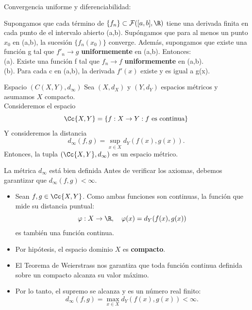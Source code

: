 \begin{frame}{Convergencia uniforme y diferenciabilidad: }
    \begin{teorema}
        Supongamos que cada término de $\{f_{n}\}\subset \mathcal{F}([a,b], \R)$ tiene una derivada finita en cada punto de el intervalo
        abierto (a,b). Supóngamos que para al menos un punto $x_0$ en (a,b), la sucesión $\{f_{n}(x_0)\}$ converge. Además, 
        supongamos que existe una función g tal que $f'_{n}\to g$ \textbf{uniformemente} en (a,b). Entonces:\\
        \medskip
        (a). Existe una función f tal que $f_{n}\to f$ \textbf{uniformemente} en (a,b).\\
        (b). Para cada c en (a,b), la derivada $f'(x)$ existe y es igual a g(x).
    \end{teorema}
\end{frame}


\begin{frame}{Espacio $(C(X,Y),d_{\infty})$}
    Sea $(X, d_X)$ y $(Y, d_Y)$ espacios métricos y asumamos $X$ compacto.\\
    Consideremos el espacio 
    \[
    \Cc{X,Y} = \{f:X\to Y : f \text{ es continua}\}
    \]
    Y consideremos la distancia
    \[
        d_{\infty}(f,g) = \sup_{x\in X} d_Y(f(x), g(x)).
    \]
    Entonces, la tupla $(\Cc{X,Y}, d_{\infty})$ es un espacio métrico.
\end{frame}

\begin{frame}{La métrica $d_{\infty}$ está bien definida}
    Antes de verificar los axiomas, debemos garantizar que $d_{\infty}(f,g) < \infty$.
    \begin{itemize}
        \item Sean $f, g \in \Cc{X,Y}$. Como ambas funciones son continuas, la función que mide su distancia puntual:
        \[ \varphi: X \to \R, \quad \varphi(x) = d_Y(f(x), g(x)) \]
        es también una función continua.
        \item Por hipótesis, el espacio dominio $X$ es \textbf{compacto}.
        \item El Teorema de Weierstrass nos garantiza que toda función continua definida sobre un compacto alcanza su valor máximo.
        \item Por lo tanto, el supremo se alcanza y es un número real finito:
        \[ d_{\infty}(f,g) = \max_{x\in X} d_Y(f(x), g(x)) < \infty. \]
    \end{itemize}
\end{frame}

